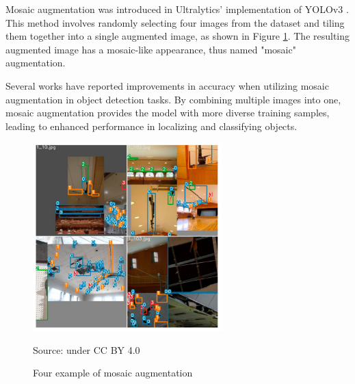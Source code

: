   Mosaic augmentation was introduced in Ultralytics' implementation of YOLOv3 \parencite{mosaic_aug}. 
  This method involves randomly selecting four images from the dataset and tiling them together into a single augmented image, as shown in Figure \ref{fig:mosaic}. 
  The resulting augmented image has a mosaic-like appearance, thus named "mosaic" augmentation.

  Several works \parencites{cspnet}{yolov4}{yolov5} have reported improvements in accuracy when utilizing mosaic augmentation in object detection tasks.
  By combining multiple images into one, mosaic augmentation provides the model with more diverse training samples, leading to enhanced performance in localizing and classifying objects.
  \captionsetup{belowskip=0pt}
  \begin{figure}[!hb]
    \centering
    \includegraphics[width=0.65\textwidth]{figures/mosaic-aug.png}
    \caption*{Source: \textcite{mosaic} under CC BY 4.0}
        \vspace{-2ex}
    \caption{Four example of mosaic augmentation}
    \label{fig:mosaic}
  \end{figure}


